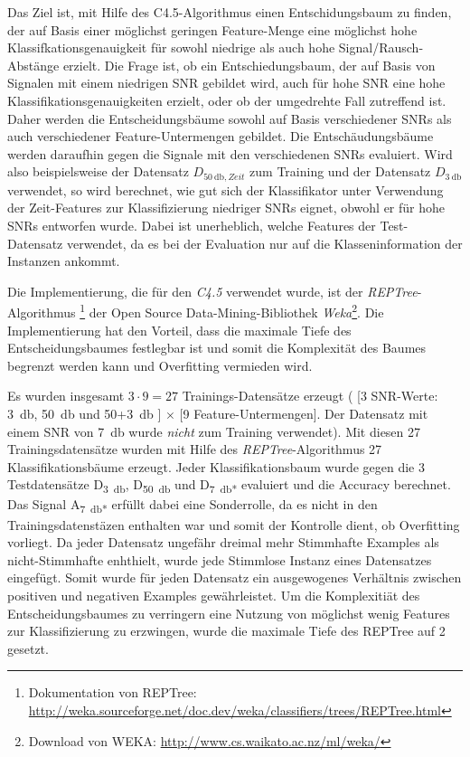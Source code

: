 Das Ziel ist, mit Hilfe des C4.5-Algorithmus einen Entschidungsbaum zu finden, der auf Basis einer möglichst geringen Feature-Menge eine möglichst hohe Klassifkationsgenauigkeit für sowohl niedrige als auch hohe Signal/Rausch-Abstänge erzielt. Die Frage ist, ob ein Entschiedungsbaum, der auf Basis von Signalen mit einem niedrigen SNR gebildet wird, auch für hohe SNR eine hohe Klassifikationsgenauigkeiten erzielt, oder ob der umgedrehte Fall zutreffend ist. Daher werden die Entscheidungsbäume sowohl auf Basis verschiedener SNRs als auch verschiedener Feature-Untermengen gebildet. Die Entschäudungsbäume werden daraufhin gegen die Signale mit den verschiedenen SNRs evaluiert. Wird also beispielsweise der Datensatz $D_{\SI{50}{\decibel},Zeit}$ zum Training und der Datensatz $D_{\SI{3}{\decibel}}$ verwendet, so wird berechnet, wie gut sich der Klassifikator unter Verwendung der Zeit-Features zur Klassifizierung niedriger SNRs eignet, obwohl er für hohe SNRs entworfen wurde. Dabei ist unerheblich, welche Features der Test-Datensatz verwendet, da es bei der Evaluation nur auf die Klasseninformation der Instanzen ankommt.

Die Implementierung, die für den \emph{C4.5} verwendet wurde, ist der \emph{REPTree}-Algorithmus \footnote{Dokumentation von REPTree: \url{http://weka.sourceforge.net/doc.dev/weka/classifiers/trees/REPTree.html}} der Open Source Data-Mining-Bibliothek \emph{Weka}\footnote{Download von WEKA: \url{http://www.cs.waikato.ac.nz/ml/weka/}}. Die Implementierung hat den Vorteil, dass die maximale Tiefe des Entscheidungsbaumes festlegbar ist und somit die Komplexität des Baumes begrenzt werden kann und Overfitting vermieden wird.

Es wurden insgesamt $3 \cdot 9 = 27$ Trainings-Datensätze erzeugt ( [3 SNR-Werte: \SI{3}{\decibel}, \SI{50}{\decibel} und 50+\SI{3}{\decibel} ] $\times$ [9 Feature-Untermengen]. Der Datensatz mit einem SNR von \SI{7}{\decibel} wurde \emph{nicht} zum Training verwendet). Mit diesen 27 Trainingsdatensätze wurden mit Hilfe des \emph{REPTree}-Algorithmus 27 Klassifikationsbäume erzeugt. Jeder Klassifikationsbaum wurde gegen die 3 Testdatensätze D\textsubscript{\SI{3}{\decibel}}, D\textsubscript{\SI{50}{\decibel}} und D\textsubscript{\SI{7}{\decibel}*} evaluiert und die Accuracy berechnet. Das Signal A\textsubscript{\SI{7}{\decibel}*} erfüllt dabei eine Sonderrolle, da es nicht in den Trainingsdatenstäzen enthalten war und somit der Kontrolle dient, ob Overfitting vorliegt. Da jeder Datensatz ungefähr dreimal mehr Stimmhafte Examples als nicht-Stimmhafte enhthielt, wurde jede Stimmlose Instanz eines Datensatzes eingefügt. Somit wurde für jeden Datensatz  ein ausgewogenes Verhältnis zwischen positiven und negativen Examples gewährleistet. Um die Komplexitiät des Entscheidungsbaumes zu verringern eine Nutzung von möglichst wenig Features zur Klassifizierung zu erzwingen, wurde die maximale Tiefe des REPTree auf 2 gesetzt. 

